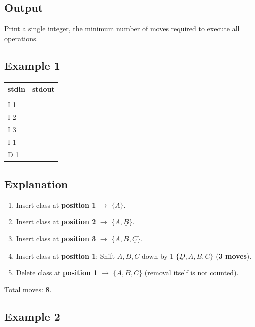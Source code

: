 \documentclass[12pt,a4paper]{article}
\begin{document}
\subsection*{\fontsize{16}{12}Output}
Print a single integer, the minimum number of moves required to execute all operations.

\subsection*{\fontsize{16}{12}Example 1}

\begin{table}[h]
  \centering
  \begin{tabularx}{\textwidth}{|>{\ttfamily}X|>{\ttfamily}X|}
  \hline
  \textbf{stdin} & \textbf{stdout} \\
  \hline
  5 & 8 \\
  I 1 &  \\
  I 2 & \\
  I 3 & \\
  I 1 &\\
  D 1 & \\
  \hline
 \end{tabularx}
\end{table}

\subsection*{\fontsize{16}{12}Explanation}
\begin{enumerate}
    \item Insert class at \textbf{position 1} $\rightarrow$ \(\{\underline{A}\}\).
    \item Insert class at \textbf{position 2} $\rightarrow$ \(\{A, \underline{B}\}\).
    \item Insert class at \textbf{position 3} $\rightarrow$ \(\{A, B, \underline{C}\}\).
    \item Insert class at \textbf{position 1}: Shift \( A, B, C \) down by 1 \(\{\underline{D}, A, B, C\}\) (\textbf{3 moves}).
    \item Delete class at \textbf{position 1} $\rightarrow$ \(\{A, B, C\}\) (removal itself is not counted).
\end{enumerate}
Total moves: \textbf{8}.

\subsection*{\fontsize{16}{12}Example 2}
\end{document}
